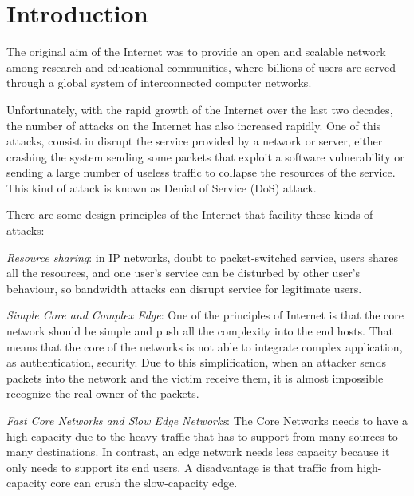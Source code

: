 
\chapter{Introduction}
\label{chapter:intro}

The original aim of the Internet was to provide an open and scalable network among research and educational communities, where billions of users are served through a global system of interconnected computer networks.

\bigskip

Unfortunately, with the rapid growth of the Internet over the last two decades, the number of attacks on the Internet has also increased rapidly. One of this attacks, consist in disrupt the service provided by a network or server, either crashing the system sending some packets that exploit a software vulnerability or sending a large number of useless traffic to collapse the resources of the service. This kind of attack is known as Denial of Service (DoS) attack.

\bigskip

There are some design principles of the Internet that facility these kinds of attacks:

\bigskip

\textit{Resource sharing}: in IP networks, doubt to packet-switched service, users shares all the resources, and one user's service can be disturbed by other user's behaviour, so bandwidth attacks can disrupt service for legitimate users.

\textit{Simple Core and Complex Edge}: One of the principles of Internet is that the core network should be simple and push all the complexity into the end hosts. That means that the core of the networks is not able to integrate complex application, as authentication, security. Due to this simplification, when an attacker sends packets into the network and the victim receive them, it is almost impossible recognize the real owner of the packets.

\textit{Fast Core Networks and Slow Edge Networks}: The Core Networks needs to have a high capacity due to the heavy traffic that has to support from many sources to many destinations. In contrast, an edge network needs less capacity because it only needs to support its end users. A disadvantage is that traffic from high-capacity core can crush the slow-capacity edge.

\bigskip


